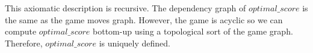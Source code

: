 \documentclass[11pt, oneside]{article}
\begin{document}

This axiomatic description is recursive. 
The dependency graph of $optimal\_score$ is the same as the game moves graph.
However, the game is acyclic so we can compute $optimal\_score$ bottom-up using 
a topological sort of the game graph.
Therefore, $optimal\_score$ is uniquely defined.

\end{document}
